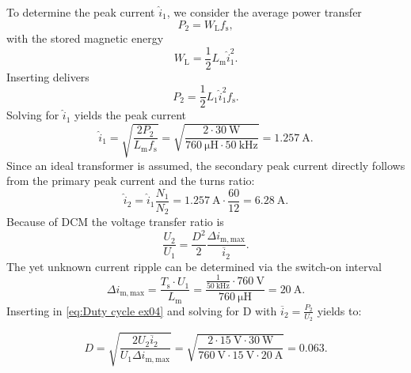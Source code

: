 \begin{solutionblock}
To determine the peak current  $\hat i_\mathrm{1}$, we consider the average power transfer
\begin{equation}
    P_\mathrm{2} = W_\mathrm{L} f_\mathrm{s}, \label{eq:output power ex04}
\end{equation}
with the stored magnetic energy
\begin{equation}
    W_\mathrm{L} = \frac{1}{2}L_\mathrm{m}\hat i_\mathrm{1}^2. \label{eq:energy primary inductance ex04}
\end{equation}
Inserting delivers
\begin{equation}
    P_\mathrm{2} = \frac{1}{2}L_\mathrm{1}\hat i_\mathrm{1}^2 f_\mathrm{s}.\label{eq:output power with IDach ex04}
\end{equation}
Solving for $\hat i_\mathrm{1}$ yields the peak current
\begin{equation}
    \hat i_\mathrm{1} = \sqrt{\frac{2P_\mathrm{2}}{L_\mathrm{m}f_\mathrm{s}}}= \sqrt{\frac{2\cdot\SI{30}{\watt}}{\SI{760}{\micro\henry}\cdot\SI{50}{\kilo\hertz}}}=\SI{1.257}{\ampere}.
\end{equation}
Since an ideal transformer is assumed, the secondary peak current directly follows from the primary peak current and the turns ratio:
\begin{equation}
    \hat i_\mathrm{2} = \hat i_\mathrm{1} \frac{N_\mathrm{1}}{N_\mathrm{2}} = \SI{1.257}{\ampere} \cdot \frac{60}{12} = \SI{6.28}{\ampere}.
\end{equation}
Because of DCM the voltage transfer ratio is
\begin{equation}
    \frac{U_2}{U_1} = \frac{D^2}{2} \frac{\Delta i_\mathrm{m,max}}{\overline{i}_2}. \label{eq:Duty cycle ex04}
\end{equation}
The yet unknown current ripple can be determined via the switch-on interval
\begin{equation}
    \Delta i_\mathrm{m,max}= \frac{T_\mathrm{s} \cdot U_1}{L_\mathrm{m}} = \frac{\frac{1}{\SI{50}{\kilo\hertz}}\cdot \SI{760}{\volt}}{\SI{760}{\micro\henry}}=\SI{20}{\ampere}.
\end{equation}
Inserting in \eqref{eq:Duty cycle ex04} and solving for D with $\overline{i}_2 = \frac{P_\mathrm{2}}{U_\mathrm{2}}$ yields to:

\begin{equation}
    D = \sqrt{\frac{2U_2\overline{i}_2}{U_1\Delta i_\mathrm{m,max}}} = \sqrt{\frac{2\cdot \SI{15}{\volt}\cdot\SI{30}{\watt}}{\SI{760}{\volt}\cdot\SI{15}{\volt}\cdot\SI{20}{\ampere}}} = 0.063.
\end{equation}

\end{solutionblock}

